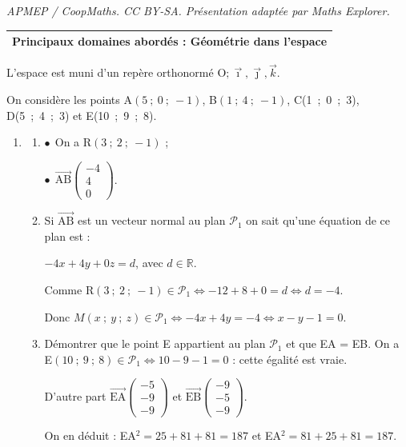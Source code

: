 \documentclass[10pt]{article}
\providecommand{\R}{\mathbb{R}}
\providecommand{\vect}[1]{\overrightarrow{#1}}
\providecommand{\Oijk}{\(\mathrm{O};\vec{\imath},\vec{\jmath},\vec{k}\)}
\begin{document}
\noindent\textit{APMEP / CoopMaths. CC BY-SA. Présentation adaptée par Maths Explorer.}\par\medskip
\medskip

\begin{tabularx}{\linewidth}{|X|}\hline
\textbf{Principaux domaines abordés :} Géométrie dans l'espace\\ \hline
\end{tabularx}

\medskip

L'espace est muni d'un repère orthonormé \Oijk.

On considère les points A$(5~;~0~;~-1)$, B$(1~;~4~;~-1)$, C(1~;~0~;~3), D(5~;~4~;~3) et E(10~;~9~;~8).

\medskip

\begin{enumerate}
\item 
	\begin{enumerate}
		\item 
		

$\bullet~~$On a R$(3~;~2~;~-1)$ ;

$\bullet~~$$\vect{\text{AB}}\begin{pmatrix}-4\\4\\0\end{pmatrix}$.
		\item 
Si $\vect{\text{AB}}$ est un vecteur normal au plan $\mathcal{P}_1$ on sait qu'une équation de ce plan est :

$-4x + 4y + 0z = d$, avec $d \in \R$.

Comme R$(3~;~2~;~-1) \in \mathcal{P}_1 \iff -12 + 8 + 0 = d \iff d = - 4$.

Donc $M(x~;~y~;~z) \in \mathcal{P}_1 \iff - 4x + 4y = -4 \iff x - y - 1 = 0$.
		\item Démontrer que le point E appartient au plan $\mathcal{P}_1$ et que EA = EB.
On a E$(10~;~9~;~8) \in \mathcal{P}_1 \iff 10 - 9 - 1 = 0$ : cette égalité est vraie.

D'autre part $\vect{\text{EA}}\begin{pmatrix}-5\\-9\\-9\end{pmatrix}$ et 
$\vect{\text{EB}}\begin{pmatrix}-9\\-5\\-9\end{pmatrix}$.

On en déduit : EA$^2 = 25 + 81 + 81 = 187$ et EA$^2 = 81 + 25 + 81 = 187$.


\end{enumerate}
\end{enumerate}
\end{document}
